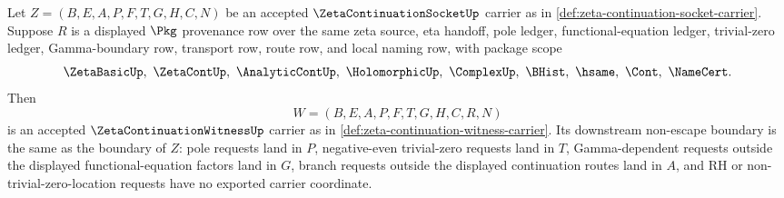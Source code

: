 \begin{theorem}
\label{thm:zeta-continuation-socket-witness-carrier-bridge}
Let $Z=(B,E,A,P,F,T,G,H,C,N)$ be an accepted $\ZetaContinuationSocketUp$ carrier as in \autoref{def:zeta-continuation-socket-carrier}. Suppose $R$ is a displayed $\Pkg$ provenance row over the same zeta source, eta handoff, pole ledger, functional-equation ledger, trivial-zero ledger, Gamma-boundary row, transport row, route row, and local naming row, with package scope
$$
\ZetaBasicUp,\ \ZetaContUp,\ \AnalyticContUp,\ \HolomorphicUp,\ \ComplexUp,\ \BHist,\ \hsame,\ \Cont,\ \NameCert.
$$
Then
$$
W=(B,E,A,P,F,T,G,H,C,R,N)
$$
is an accepted $\ZetaContinuationWitnessUp$ carrier as in \autoref{def:zeta-continuation-witness-carrier}. Its downstream non-escape boundary is the same as the boundary of $Z$: pole requests land in $P$, negative-even trivial-zero requests land in $T$, Gamma-dependent requests outside the displayed functional-equation factors land in $G$, branch requests outside the displayed continuation routes land in $A$, and RH or non-trivial-zero-location requests have no exported carrier coordinate.
\end{theorem}
